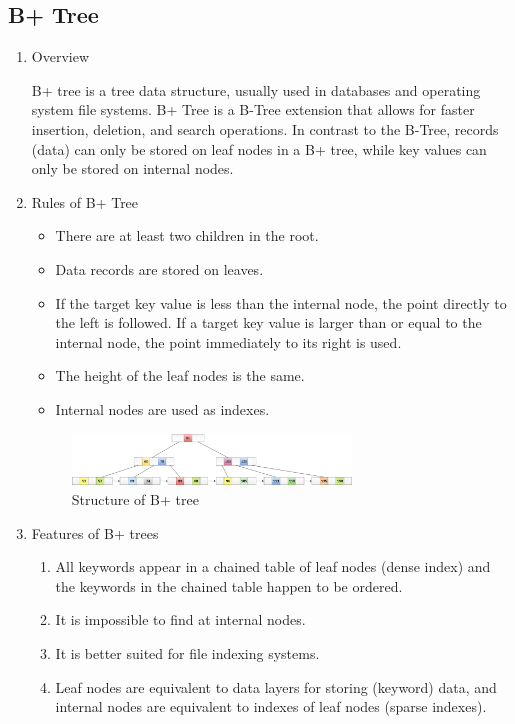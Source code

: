 \subsection{B+ Tree}
\begin{enumerate}
\item Overview
    
B+ tree is a tree data structure, usually used in databases and operating system file systems. B+ Tree is a B-Tree extension that allows for faster insertion, deletion, and search operations. In contrast to the B-Tree, records (data) can only be stored on leaf nodes in a B+ tree, while key values can only be stored on internal nodes\cite{b_plus}.



\item Rules of B+ Tree

\begin{itemize}
    \item There are at least two children in the root.
    \item Data records are stored on leaves.
    \item If the target key value is less than the internal node, the point directly to the left is followed. If a target key value is larger than or equal to the internal node, the point immediately to its right is used\cite{walker_2021}.
    \item The height of the leaf nodes is the same.
    \item Internal nodes are used as indexes.
\end{itemize}

\begin{figure}[hbt!]
	\centering
 	\includegraphics[width=0.7\textwidth]{gfx/b-plus-tree.png}
	\caption{Structure of B+ tree \cite{johnny_2016}}
	\label{fig:bplus_structure}
\end{figure}

\item Features of B+ trees

\begin{enumerate}
    \item All keywords appear in a chained table of leaf nodes (dense index) and the keywords in the chained table happen to be ordered.
    \item It is impossible to find at internal nodes.
    \item It is better suited for file indexing systems.
    \item Leaf nodes are equivalent to data layers for storing (keyword) data, and internal nodes are equivalent to indexes of leaf nodes (sparse indexes).
\end{enumerate}




\end{enumerate}
